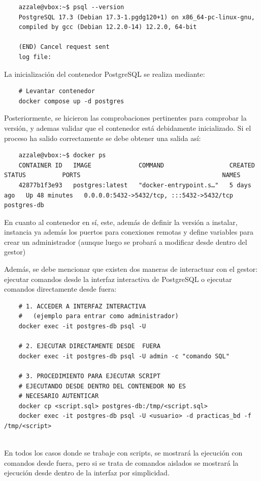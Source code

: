 \documentclass{article}
\begin{document}
\begin{tcolorbox}[colback=black, coltext=white, fontupper=\ttfamily, title=Terminal]
\begin{verbatim}
    azzale@vbox:~$ psql --version
    PostgreSQL 17.3 (Debian 17.3-1.pgdg120+1) on x86_64-pc-linux-gnu, 
    compiled by gcc (Debian 12.2.0-14) 12.2.0, 64-bit

    (END) Cancel request sent
    log file:
\end{verbatim}
\end{tcolorbox}

La inicialización del contenedor PostgreSQL se realiza mediante:
\begin{lstlisting}
    # Levantar contenedor
    docker compose up -d postgres
\end{lstlisting}
Posteriormente, se hicieron las comprobaciones pertinentes para comprobar la versión, y ademas validar que el contenedor está debidamente inicializado. Si el proceso ha salido correctamente se debe obtener una salida así:

\begin{tcolorbox}[colback=black, coltext=white, fontupper=\ttfamily, title=Terminal]
\begin{verbatim}
    azzale@vbox:~$ docker ps
    CONTAINER ID   IMAGE             COMMAND                  CREATED      STATUS          PORTS                                       NAMES
    42877b1f3e93   postgres:latest   "docker-entrypoint.s…"   5 days ago   Up 48 minutes   0.0.0.0:5432->5432/tcp, :::5432->5432/tcp   postgres-db
\end{verbatim}
\end{tcolorbox}

En cuanto al contenedor en sí, este, además de definir la versión a instalar, instancia ya además los puertos para conexiones remotas y define variables para crear un administrador (aunque luego se probará a modificar desde dentro del gestor)

Además, se debe mencionar que existen dos maneras de interactuar con el gestor: ejecutar comandos desde la interfaz interactiva de PostgreSQL o ejecutar comandos directamente desde fuera:
\begin{lstlisting}
    # 1. ACCEDER A INTERFAZ INTERACTIVA
    #   (ejemplo para entrar como administrador)
    docker exec -it postgres-db psql -U

    # 2. EJECUTAR DIRECTAMENTE DESDE  FUERA
    docker exec -it postgres-db psql -U admin -c "comando SQL"

    # 3. PROCEDIMIENTO PARA EJECUTAR SCRIPT
    # EJECUTANDO DESDE DENTRO DEL CONTENEDOR NO ES
    # NECESARIO AUTENTICAR
    docker cp <script.sql> postgres-db:/tmp/<script.sql>
    docker exec -it postgres-db psql -U <usuario> -d practicas_bd -f /tmp/<script>


\end{lstlisting}
En todos los casos donde se trabaje con scripts, se mostrará la ejecución con comandos desde fuera, pero si se trata de comandos aislados se mostrará la ejecución desde dentro de la interfaz por simplicidad.
\end{document}
